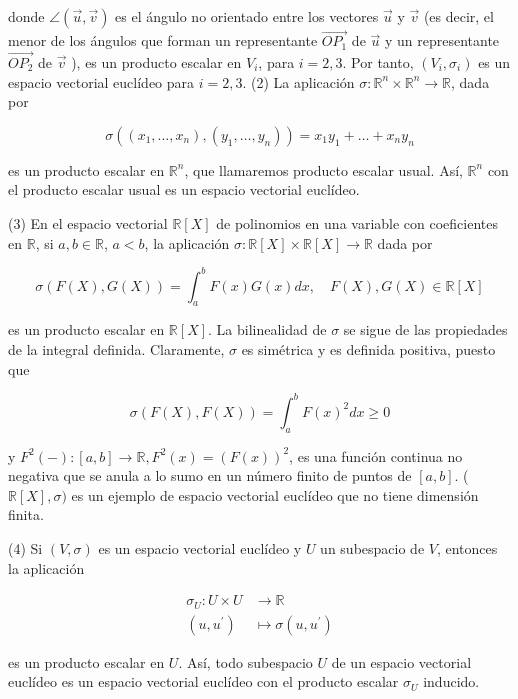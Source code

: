 \documentclass[12pt, a4paper, ones, notitlepage, openany,titlepage]{article}
\begin{document}
donde $\angle(\vec{u}, \vec{v})$ es el ángulo no orientado entre los vectores $\vec{u}$ y $\vec{v}$ (es decir, el menor de los ángulos que forman un representante $\overrightarrow{O P_{1}}$ de $\vec{u}$ y un representante $\overrightarrow{O P_{2}}$ de $\vec{v}$ ), es un producto escalar en $V_{i}$, para $i=2,3$. Por tanto, $\left(V_{i}, \sigma_{i}\right)$ es un espacio vectorial euclídeo para $i=2,3$. (2) La aplicación $\sigma: \mathbb{R}^{n} \times \mathbb{R}^{n} \rightarrow \mathbb{R}$, dada por

$$
\sigma\left(\left(x_{1}, \ldots, x_{n}\right),\left(y_{1}, \ldots, y_{n}\right)\right)=x_{1} y_{1}+\ldots+x_{n} y_{n}
$$

es un producto escalar en $\mathbb{R}^{n}$, que llamaremos producto escalar usual. Así, $\mathbb{R}^{n}$ con el producto escalar usual es un espacio vectorial euclídeo.

(3) En el espacio vectorial $\mathbb{R}[X]$ de polinomios en una variable con coeficientes en $\mathbb{R}$, si $a, b \in \mathbb{R}$, $a<b$, la aplicación $\sigma: \mathbb{R}[X] \times \mathbb{R}[X] \rightarrow \mathbb{R}$ dada por

$$
\sigma(F(X), G(X))=\int_{a}^{b} F(x) G(x) d x, \quad F(X), G(X) \in \mathbb{R}[X]
$$

es un producto escalar en $\mathbb{R}[X]$. La bilinealidad de $\sigma$ se sigue de las propiedades de la integral definida. Claramente, $\sigma$ es simétrica y es definida positiva, puesto que

$$
\sigma(F(X), F(X))=\int_{a}^{b} F(x)^{2} d x \geq 0
$$

y $F^{2}(-):[a, b] \rightarrow \mathbb{R}, F^{2}(x)=(F(x))^{2}$, es una función continua no negativa que se anula a lo sumo en un número finito de puntos de $[a, b]$. ( $\mathbb{R}[X], \sigma)$ es un ejemplo de espacio vectorial euclídeo que no tiene dimensión finita.

(4) Si $(V, \sigma)$ es un espacio vectorial euclídeo y $U$ un subespacio de $V$, entonces la aplicación

$$
\begin{aligned}
	\sigma_{U}: U \times U & \rightarrow \mathbb{R} \\
	\left(u, u^{\prime}\right) & \longmapsto \sigma\left(u, u^{\prime}\right)
\end{aligned}
$$

es un producto escalar en $U$. Así, todo subespacio $U$ de un espacio vectorial euclídeo es un espacio vectorial euclídeo con el producto escalar $\sigma_{U}$ inducido.
\end{document}
